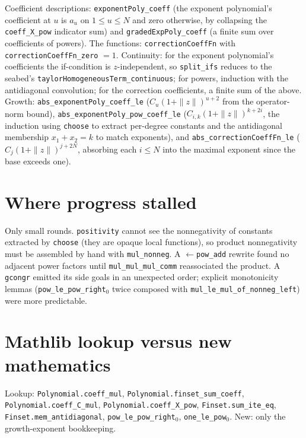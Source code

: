 \documentclass[11pt]{article}
\newcommand{\code}[1]{\texttt{#1}}
\begin{document}
Coefficient descriptions: \code{exponentPoly\_coeff} (the exponent
polynomial's coefficient at $u$ is $a_u$ on $1 \le u \le N$ and zero
otherwise, by collapsing the \code{coeff\_X\_pow} indicator sum) and
\code{gradedExpPoly\_coeff} (a finite sum over coefficients of
powers). The functions: \code{correctionCoeffFn} with
\code{correctionCoeffFn\_zero} $= 1$. Continuity:
for the exponent polynomial's coefficients the if-condition is
$z$-independent, so \code{split\_ifs} reduces to the seabed's
\code{taylorHomogeneousTerm\_continuous}; for powers, induction with
the antidiagonal convolution; for the correction coefficients, a
finite sum of the above. Growth: \code{abs\_exponentPoly\_coeff\_le}
($C_u (1+\|z\|)^{u+2}$ from the operator-norm bound),
\code{abs\_exponentPoly\_pow\_coeff\_le}
($C_{i,k}(1+\|z\|)^{k+2i}$, the induction using
\code{choose} to extract per-degree constants and the antidiagonal
membership $x_1 + x_2 = k$ to match exponents), and
\code{abs\_correctionCoeffFn\_le}
($C_j (1+\|z\|)^{j+2N}$, absorbing each $i \le N$ into the maximal
exponent since the base exceeds one).

\section{Where progress stalled}

Only small rounds. \code{positivity} cannot see the nonnegativity of
constants extracted by \code{choose} (they are opaque local
functions), so product nonnegativity must be assembled by hand with
\code{mul\_nonneg}. A $\leftarrow$\code{pow\_add} rewrite found no
adjacent power factors until \code{mul\_mul\_mul\_comm} reassociated
the product. A \code{gcongr} emitted its side goals in an unexpected
order; explicit monotonicity lemmas
(\code{pow\_le\_pow\_right}$_0$ twice composed with
\code{mul\_le\_mul\_of\_nonneg\_left}) were more predictable.

\section{Mathlib lookup versus new mathematics}

\begin{sloppypar}
Lookup: \code{Polynomial.coeff\_mul},
\code{Polynomial.finset\_sum\_coeff}, \code{Polynomial.coeff\_C\_mul},
\code{Polynomial.coeff\_X\_pow}, \code{Finset.sum\_ite\_eq},
\code{Finset.mem\_antidiagonal}, \code{pow\_le\_pow\_right}$_0$,
\code{one\_le\_pow}$_0$. New: only the growth-exponent bookkeeping.
\end{sloppypar}
\end{document}
